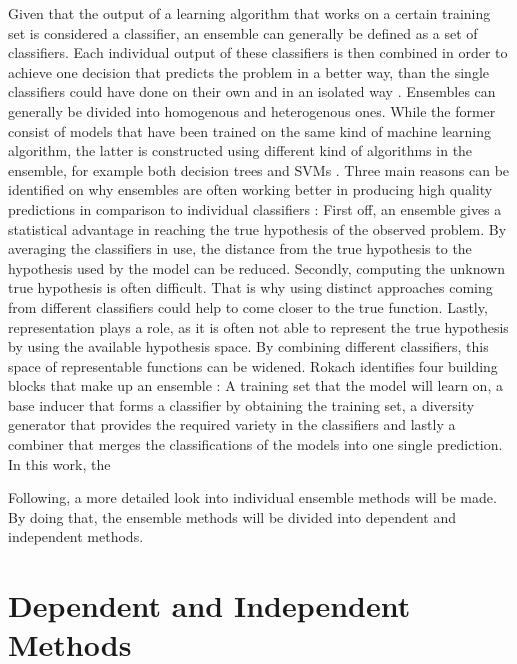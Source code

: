 Given that the output of a learning algorithm that works on a certain training set is considered a classifier, an ensemble can generally be defined as a set of classifiers. Each individual output of these classifiers is then combined in order to achieve one decision that predicts the problem in a better way, than the single classifiers could have done on their own and in an isolated way \cite{dietterich2000}. Ensembles can generally be divided into homogenous and heterogenous ones. While the former consist of models that have been trained on the same kind of machine learning algorithm, the latter is constructed using different kind of algorithms in the ensemble, for example both decision trees and SVMs \cite{zhou2012}. Three main reasons can be identified on why ensembles are often working better in producing high quality predictions in comparison to individual classifiers \cite{dietterich2000}: First off, an ensemble gives a statistical advantage in reaching the true hypothesis of the observed problem. By averaging the classifiers in use, the distance from the true hypothesis to the hypothesis used by the model can be reduced. Secondly, computing the unknown true hypothesis is often difficult. That is why using distinct approaches coming from different classifiers could help to come closer to the true function. Lastly, representation plays a role, as it is often not able to represent the true hypothesis by using the available hypothesis space. By combining different classifiers, this space of representable functions can be widened. Rokach identifies four building blocks that make up an ensemble \cite{rokach2010}: A training set that the model will learn on, a base inducer that forms a classifier by obtaining the training set, a diversity generator that provides the required variety in the classifiers and lastly a combiner that merges the classifications of the models into one single prediction. In this work, the 

Following, a more detailed look into individual ensemble methods will be made. By doing that, the ensemble methods will be divided into dependent and independent methods.  

\section{Dependent  and Independent Methods}

